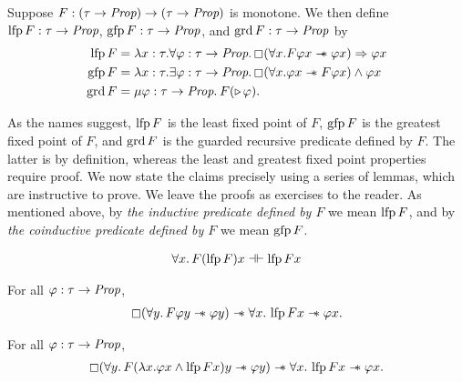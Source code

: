 \begin{definition}
  Suppose  $F:(\tau\to\textit{Prop})\to(\tau\to\textit{Prop})$ is monotone. We then define
  $\operatorname{lfp} F: \tau\to\textit{Prop}$, $\operatorname{gfp} F : \tau\to\textit{Prop}$, and $\operatorname{grd} F: \tau\to\textit{Prop}$ by
  \begin{align*}
    \lfp F & = \lambda x:\tau. \forall \phi:\tau\to\Prop.
             \persistently (\forall x. F \phi x \wand \phi x) \implies \phi x\\
    \gfp F & = \lambda x:\tau. \exists \phi:\tau\to\Prop.
             \persistently (\forall x. \phi x \wand F \phi x) \land \phi x \\
    \grd F & = \MU \phi:\tau\to\Prop. F(\later \phi).
  \end{align*}
\end{definition}

As the names suggest, $\operatorname{lfp} F$ is the least fixed point of $F$, $\operatorname{gfp} F$ is the greatest
fixed point of $F$, and $\operatorname{grd} F$ is the guarded recursive predicate defined by $F$.
The latter is by definition, whereas the least and greatest fixed point properties require proof. 
We now state the claims precisely using a series of lemmas, which
are instructive to prove. We leave the proofs as exercises to the reader.
As mentioned above, by \emph{the inductive predicate defined by $F$} we mean $\operatorname{lfp} F$, and
by \emph{the coinductive predicate defined by $F$} we mean $\operatorname{gfp} F$.
  
\begin{lemma}
  \begin{align*}
    \forall x.\, F (\operatorname{lfp} F) x  \mathrel{\dashv\vdash}  \operatorname{lfp} F x
  \end{align*}
\end{lemma}

\begin{lemma}
  For all $\varphi: \tau\to\textit{Prop}$,
  \begin{align*}
    \mathop{\boxempty}(\forall y.\, F \varphi y \mathrel{-\!\!\ast} \varphi y) \mathrel{-\!\!\ast}
    \forall x.\, \operatorname{lfp} F x \mathrel{-\!\!\ast} \varphi x.
  \end{align*}
\end{lemma}

\begin{lemma}
  For all $\varphi: \tau\to\textit{Prop}$,
  \begin{align*}
    \mathop{\boxempty}(\forall y.\, F (\lambda x. \varphi x \land \operatorname{lfp} F x) y \mathrel{-\!\!\ast} \varphi y) \mathrel{-\!\!\ast} 
    \forall x.\, \operatorname{lfp} F x \mathrel{-\!\!\ast} \varphi x.
  \end{align*}
\end{lemma}

